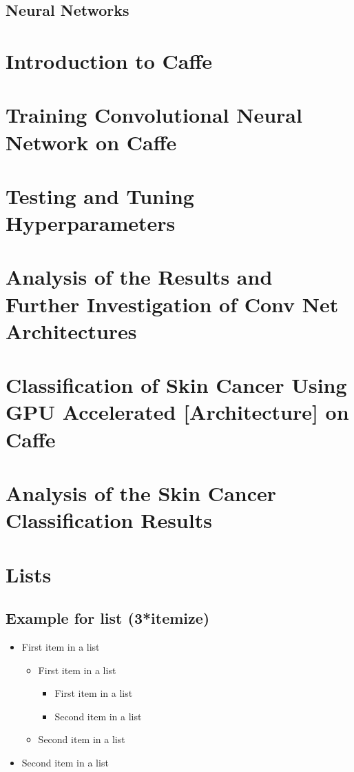 \documentclass[paper=a4, fontsize=11pt]{scrartcl}
\numberwithin{equation}{section}		%
\numberwithin{figure}{section}			%
\numberwithin{table}{section}			%
\begin{document}
	\subsection{Neural Networks}
	
	
	\section{Introduction to Caffe}
	\section{Training Convolutional Neural Network on Caffe}
	\section{Testing and Tuning Hyperparameters}
	\section{Analysis of the Results and Further Investigation of Conv Net Architectures}
	\section{Classification of Skin Cancer Using GPU Accelerated [Architecture] on Caffe}
	\section{Analysis of the Skin Cancer Classification Results}
	
	
	\section{Lists}
	
	\subsection{Example for list (3*itemize)}
	\begin{itemize}
		\item First item in a list 
		\begin{itemize}
			\item First item in a list 
			\begin{itemize}
				\item First item in a list 
				\item Second item in a list 
			\end{itemize}
			\item Second item in a list 
		\end{itemize}
		\item Second item in a list 
	\end{itemize}
	
\end{document}
